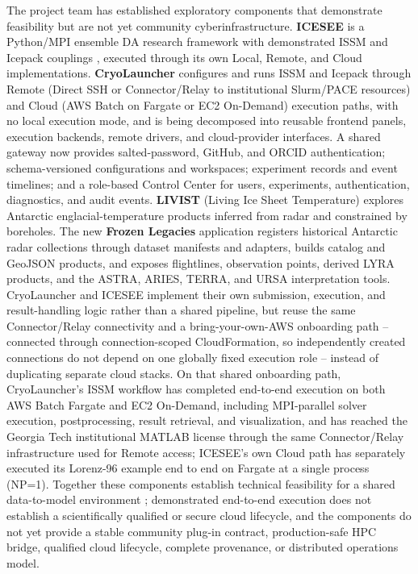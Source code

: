 The project team has established exploratory components that demonstrate
feasibility but are not yet community cyberinfrastructure. \textbf{ICESEE} is
a Python/MPI ensemble DA research framework with demonstrated ISSM and Icepack
couplings \citep{kyanjo2026icesee}, executed through its own Local, Remote,
and Cloud implementations. \textbf{CryoLauncher} configures and runs ISSM and
Icepack through Remote (Direct SSH or Connector/Relay to institutional
Slurm/PACE resources) and Cloud (AWS Batch on Fargate or EC2 On-Demand)
execution paths, with no local execution mode, and is being decomposed into
reusable frontend panels, execution backends, remote drivers, and
cloud-provider interfaces. A shared
gateway now provides salted-password, GitHub, and ORCID authentication;
schema-versioned configurations and workspaces; experiment records and event
timelines; and a role-based Control Center for users, experiments,
authentication, diagnostics, and audit events. \textbf{LIVIST} (Living Ice
Sheet Temperature) explores Antarctic englacial-temperature products inferred
from radar and constrained by boreholes. The new \textbf{Frozen Legacies}
application registers historical Antarctic radar collections through dataset
manifests and adapters, builds catalog and GeoJSON products, and exposes
flightlines, observation points, derived LYRA products, and the ASTRA, ARIES,
TERRA, and URSA interpretation tools. CryoLauncher and ICESEE implement their
own submission, execution, and result-handling logic rather than a shared
pipeline, but reuse the same Connector/Relay connectivity and a
bring-your-own-AWS onboarding path -- connected through connection-scoped
CloudFormation, so independently created connections do not depend on one
globally fixed execution role -- instead of duplicating separate cloud
stacks. On that shared onboarding path, CryoLauncher's ISSM workflow has
completed end-to-end execution on both AWS Batch Fargate and EC2 On-Demand,
including MPI-parallel solver execution, postprocessing, result retrieval,
and visualization, and has reached the Georgia Tech institutional MATLAB
license through the same Connector/Relay infrastructure used for Remote
access; ICESEE's own Cloud path has separately executed its Lorenz-96
example end to end on Fargate at a single process (NP=1). Together these
components establish technical feasibility for a shared data-to-model
environment \citep{cryostack2026}; demonstrated end-to-end execution does not
establish a scientifically qualified or secure cloud lifecycle, and the
components do not yet provide a stable community plug-in contract,
production-safe HPC bridge, qualified cloud lifecycle, complete provenance,
or distributed operations model.

